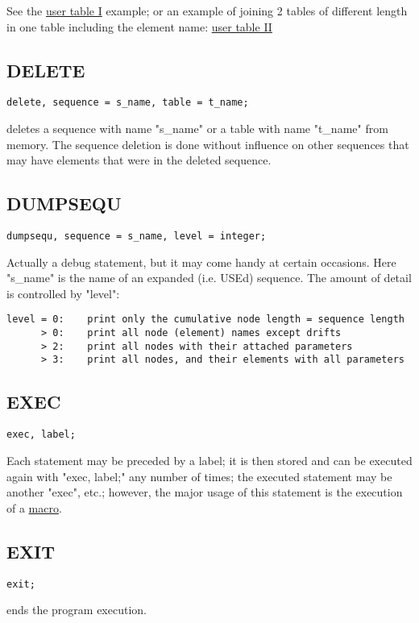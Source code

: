 See the \href{../Introduction/select.html#ucreate}{user table I}
example; 
or an example of joining 2 tables of different length in one table
including the element name:
\href{../Introduction/select.html#screate}{user table II} 

\subsection{DELETE}
\begin{verbatim}
delete, sequence = s_name, table = t_name;
\end{verbatim} 
deletes a sequence with name "s\_name" or a table with name "t\_name"
from memory. The sequence deletion is done without influence on other
sequences that may have elements that were in the deleted sequence.  

\subsection{DUMPSEQU}
\begin{verbatim}
dumpsequ, sequence = s_name, level = integer;
\end{verbatim} 
Actually a debug statement, but it may come handy at certain
occasions. Here "s\_name" is the name of an expanded (i.e. USEd)
sequence. The amount of detail is controlled by "level":  
\begin{verbatim}
level = 0:    print only the cumulative node length = sequence length
      > 0:    print all node (element) names except drifts
      > 2:    print all nodes with their attached parameters
      > 3:    print all nodes, and their elements with all parameters
\end{verbatim}


\subsection{EXEC}
\begin{verbatim}
exec, label;
\end{verbatim} 
Each statement may be preceded by a label; it is then stored and can be
executed again with "exec, label;" any number of times; the executed
statement may be another "exec", etc.; however, the major usage of this
statement is the execution of a \href{special.html#macro}{macro}.  

\subsection{EXIT}
\begin{verbatim}
exit;
\end{verbatim} 
ends the program execution. 

